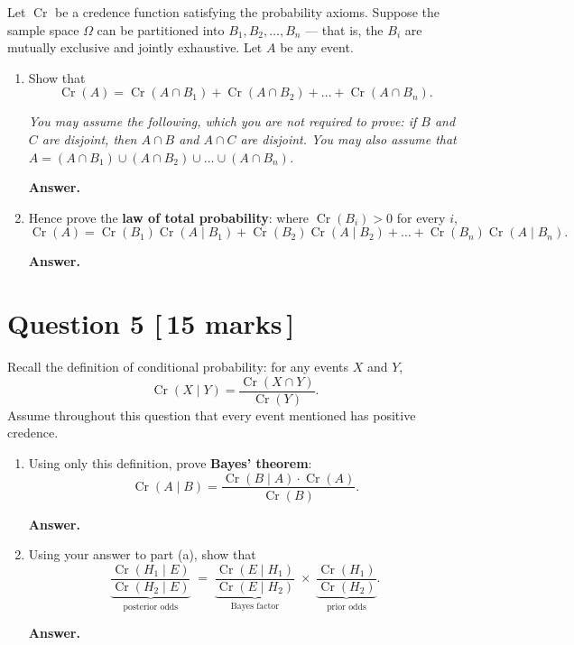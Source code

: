 \documentclass[11pt]{article}
\theoremstyle{definition}
\DeclareMathOperator{\Cr}{Cr}
\newenvironment{answer}
  {\par\medskip\noindent\textbf{Answer.}\par\nobreak\smallskip\ignorespaces}
  {\par\medskip}
\begin{document}
Let $\Cr$ be a credence function satisfying the probability axioms. Suppose the
sample space $\Omega$ can be partitioned into $B_1, B_2, \dots, B_n$ --- that is,
the $B_i$ are mutually exclusive and jointly exhaustive. Let $A$ be any event.

\begin{enumerate}[label=(\alph*)]

\item Show that
\[
	\Cr(A) = \Cr(A \cap B_1) + \Cr(A \cap B_2) + \dots + \Cr(A \cap B_n).
\]

\emph{You may assume the following, which you are not required to prove: if $B$
and $C$ are disjoint, then $A \cap B$ and $A \cap C$ are disjoint. You may also
assume that $A = (A \cap B_1) \cup (A \cap B_2) \cup \dots \cup (A \cap B_n)$.}

\begin{answer}
\end{answer}

\item Hence prove the \textbf{law of total probability}: where $\Cr(B_i) > 0$
for every $i$,
\[
	\Cr(A) = \Cr(B_1)\Cr(A \mid B_1) + \Cr(B_2)\Cr(A \mid B_2)
	         + \dots + \Cr(B_n)\Cr(A \mid B_n).
\]

\begin{answer}
\end{answer}

\end{enumerate}

\section*{Question 5 \hfill \normalsize [\,15 marks\,]}

Recall the definition of conditional probability: for any events $X$ and $Y$,
\[
	\Cr(X \mid Y) = \frac{\Cr(X \cap Y)}{\Cr(Y)}.
\]
Assume throughout this question that every event mentioned has positive credence.

\begin{enumerate}[label=(\alph*)]

\item Using only this definition, prove \textbf{Bayes' theorem}:
\[
	\Cr(A \mid B) = \frac{\Cr(B \mid A) \cdot \Cr(A)}{\Cr(B)}.
\]

\begin{answer}
\end{answer}

\item Using your answer to part (a), show that
\[
	\underbrace{\frac{\Cr(H_1 \mid E)}{\Cr(H_2 \mid E)}}_{\text{posterior odds}}
	\;=\;
	\underbrace{\frac{\Cr(E \mid H_1)}{\Cr(E \mid H_2)}}_{\text{Bayes factor}}
	\;\times\;
	\underbrace{\frac{\Cr(H_1)}{\Cr(H_2)}}_{\text{prior odds}}.
\]

\begin{answer}
\end{answer}

\end{enumerate}
\end{document}
